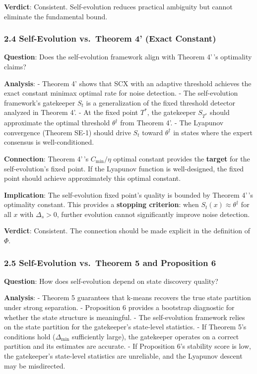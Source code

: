 \documentclass[
  12pt,
]{ctexart}
\begin{document}
\textbf{Verdict}: Consistent. Self-evolution reduces practical ambiguity
but cannot eliminate the fundamental bound.

\subsubsection{2.4 Self-Evolution vs.~Theorem 4' (Exact
Constant)}\label{self-evolution-vs.-theorem-4-exact-constant}

\textbf{Question}: Does the self-evolution framework align with Theorem
4'\,'s optimality claims?

\textbf{Analysis}: - Theorem 4' shows that SCX with an adaptive
threshold achieves the exact constant minimax optimal rate for noise
detection. - The self-evolution framework's gatekeeper \(S_t\) is a
generalization of the fixed threshold detector analyzed in Theorem 4'. -
At the fixed point \(T^*\), the gatekeeper \(S_{T^*}\) should
approximate the optimal threshold \(\theta^\dagger\) from Theorem 4'. -
The Lyapunov convergence (Theorem SE-1) should drive \(S_t\) toward
\(\theta^\dagger\) in states where the expert consensus is
well-conditioned.

\textbf{Connection}: Theorem 4'\,'s \(C_{\min}/\eta\) optimal constant
provides the \textbf{target} for the self-evolution's fixed point. If
the Lyapunov function is well-designed, the fixed point should achieve
approximately this optimal constant.

\textbf{Implication}: The self-evolution fixed point's quality is
bounded by Theorem 4'\,'s optimality constant. This provides a
\textbf{stopping criterion}: when \(S_t(x) \approx \theta^\dagger\) for
all \(x\) with \(\Delta_s > 0\), further evolution cannot significantly
improve noise detection.

\textbf{Verdict}: Consistent. The connection should be made explicit in
the definition of \(\Phi\).

\subsubsection{2.5 Self-Evolution vs.~Theorem 5 and Proposition
6}\label{self-evolution-vs.-theorem-5-and-proposition-6}

\textbf{Question}: How does self-evolution depend on state discovery
quality?

\textbf{Analysis}: - Theorem 5 guarantees that k-means recovers the true
state partition under strong separation. - Proposition 6 provides a
bootstrap diagnostic for whether the state structure is meaningful. -
The self-evolution framework relies on the state partition for the
gatekeeper's state-level statistics. - If Theorem 5's conditions hold
(\(\Delta_{\min}\) sufficiently large), the gatekeeper operates on a
correct partition and its estimates are accurate. - If Proposition 6's
stability score is low, the gatekeeper's state-level statistics are
unreliable, and the Lyapunov descent may be misdirected.
\end{document}
